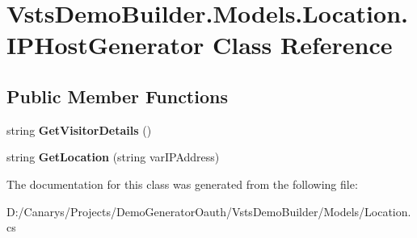 \hypertarget{class_vsts_demo_builder_1_1_models_1_1_location_1_1_i_p_host_generator}{}\section{Vsts\+Demo\+Builder.\+Models.\+Location.\+I\+P\+Host\+Generator Class Reference}
\label{class_vsts_demo_builder_1_1_models_1_1_location_1_1_i_p_host_generator}
\subsection*{Public Member Functions}
\begin{DoxyCompactItemize}
\item 
\mbox{\label{class_vsts_demo_builder_1_1_models_1_1_location_1_1_i_p_host_generator_a93b89fccc091c7b5785c2ccb4c57456f}} 
string {\bfseries Get\+Visitor\+Details} ()
\item 
\mbox{\label{class_vsts_demo_builder_1_1_models_1_1_location_1_1_i_p_host_generator_a44af429710c012d700855d7c7694a9fe}} 
string {\bfseries Get\+Location} (string var\+I\+P\+Address)
\end{DoxyCompactItemize}


The documentation for this class was generated from the following file\+:\begin{DoxyCompactItemize}
\item 
D\+:/\+Canarys/\+Projects/\+Demo\+Generator\+Oauth/\+Vsts\+Demo\+Builder/\+Models/Location.\+cs\end{DoxyCompactItemize}
